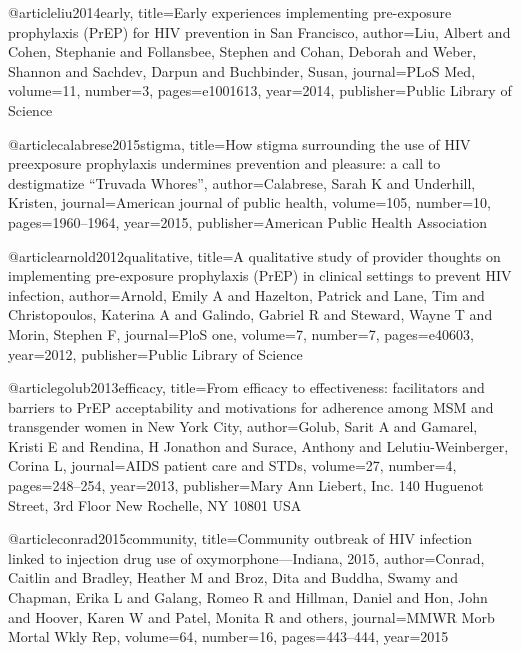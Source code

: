 



@article{liu2014early,
  title={Early experiences implementing pre-exposure prophylaxis (PrEP) for HIV prevention in San Francisco},
  author={Liu, Albert and Cohen, Stephanie and Follansbee, Stephen and Cohan, Deborah and Weber, Shannon and Sachdev, Darpun and Buchbinder, Susan},
  journal={PLoS Med},
  volume={11},
  number={3},
  pages={e1001613},
  year={2014},
  publisher={Public Library of Science}
}

@article{calabrese2015stigma,
  title={How stigma surrounding the use of HIV preexposure prophylaxis undermines prevention and pleasure: a call to destigmatize “Truvada Whores”},
  author={Calabrese, Sarah K and Underhill, Kristen},
  journal={American journal of public health},
  volume={105},
  number={10},
  pages={1960--1964},
  year={2015},
  publisher={American Public Health Association}
}

@article{arnold2012qualitative,
  title={A qualitative study of provider thoughts on implementing pre-exposure prophylaxis (PrEP) in clinical settings to prevent HIV infection},
  author={Arnold, Emily A and Hazelton, Patrick and Lane, Tim and Christopoulos, Katerina A and Galindo, Gabriel R and Steward, Wayne T and Morin, Stephen F},
  journal={PloS one},
  volume={7},
  number={7},
  pages={e40603},
  year={2012},
  publisher={Public Library of Science}
}

@article{golub2013efficacy,
  title={From efficacy to effectiveness: facilitators and barriers to PrEP acceptability and motivations for adherence among MSM and transgender women in New York City},
  author={Golub, Sarit A and Gamarel, Kristi E and Rendina, H Jonathon and Surace, Anthony and Lelutiu-Weinberger, Corina L},
  journal={AIDS patient care and STDs},
  volume={27},
  number={4},
  pages={248--254},
  year={2013},
  publisher={Mary Ann Liebert, Inc. 140 Huguenot Street, 3rd Floor New Rochelle, NY 10801 USA}
}

@article{conrad2015community,
  title={Community outbreak of HIV infection linked to injection drug use of oxymorphone—Indiana, 2015},
  author={Conrad, Caitlin and Bradley, Heather M and Broz, Dita and Buddha, Swamy and Chapman, Erika L and Galang, Romeo R and Hillman, Daniel and Hon, John and Hoover, Karen W and Patel, Monita R and others},
  journal={MMWR Morb Mortal Wkly Rep},
  volume={64},
  number={16},
  pages={443--444},
  year={2015}
}

